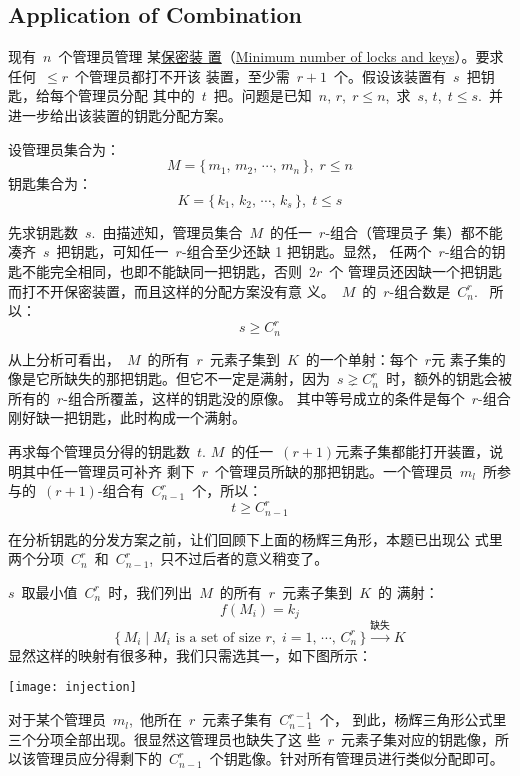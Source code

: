 \subsection{Application of Combination}
\label{sec:appl-comb}

现有~$n$~个管理员管理
某\href{https://math.stackexchange.com/q/581461}{保密装
  置}（\href{https://math.stackexchange.com/q/1316831}{Minimum
  number of locks and keys}）。要求任何~$\leq r$~个管理员都打不开该
装置，至少需~$r + 1$~个。假设该装置有~$s$~把钥匙，给每个管理员分配
其中的~$t$~把。问题是已知~$n,\, r,\; r \leq
n$,~求~$s,\, t,\; t \leq s$.~并进一步给出该装置的钥匙分配方案。

设管理员集合为：
\[ M = \{\, m_1,\, m_2,\, \cdots,\, m_n\, \},\; r \leq n \]
钥匙集合为：
\[ K = \{\, k_1,\, k_2,\, \cdots,\, k_s\, \},\; t \leq s \]

先求钥匙数~$s$.~由描述知，管理员集合~$M$~的任一~$r$-组合（管理员子
集）都不能凑齐~$s$~把钥匙，可知任一~$r$-组合至少还缺 1 把钥匙。显然，
任两个~$r$-组合的钥匙不能完全相同，也即不能缺同一把钥匙，否则~$2r$~个
管理员还因缺一个把钥匙而打不开保密装置，而且这样的分配方案没有意
义。~$M$~的~$r$-组合数是~$C_n^r$.~ 所以：\[ s \geq C_n^r\]

从上分析可看出，~$M$~的所有~$r$~元素子集到~$K$~的一个单射：每个~$r$元
素子集的像是它所缺失的那把钥匙。但它不一定是满射，因为~$s \gneq
C_n^r$~时，额外的钥匙会被所有的~$r$-组合所覆盖，这样的钥匙没的原像。
其中等号成立的条件是每个~$r$-组合刚好缺一把钥匙，此时构成一个满射。

再求每个管理员分得的钥匙数~$t$.
$M$~的任一~$(r + 1)$元素子集都能打开装置，说明其中任一管理员可补齐
剩下~$r$~个管理员所缺的那把钥匙。一个管理员~$m_l$~所参与的~$(r +
1)$-组合有~$C_{n - 1}^r$~个，所以：\[ t \geq C_{n - 1}^r \]

在分析钥匙的分发方案之前，让们回顾下上面的杨辉三角形，本题已出现公
式里两个分项~$C_n^r$~和~$C_{n - 1}^r$,~只不过后者的意义稍变了。

$s$~取最小值~$C_n^r$~时，我们列出~$M$~的所有~$r$~元素子集到~$K$~的
满射：\[ f(M_i) = k_j\]
\[ \{\, M_i \mid M_i \text{ is a set of size } r,\; i = 1,\,
  \cdots,\, C_n^r\, \} \xrightarrow{ \text{缺失} } K \]
显然这样的映射有很多种，我们只需选其一，如下图所示：

\begin{center}
  \texttt{[image: injection]}
\end{center}

对于某个管理员~$m_l$,~他所在~$r$~元素子集有~$C_{n - 1}^{r - 1}$~个，
到此，杨辉三角形公式里三个分项全部出现。很显然这管理员也缺失了这
些~$r$~元素子集对应的钥匙像，所以该管理员应分得剩下的~$C_{n -
  1}^r$~个钥匙像。针对所有管理员进行类似分配即可。

